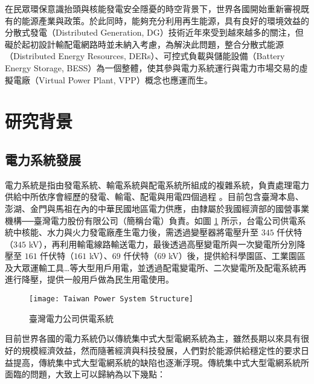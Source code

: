 在民眾環保意識抬頭與核能發電安全隱憂的時空背景下，世界各國開始重新審視既有的能源產業與政策。於此同時，能夠充分利用再生能源，具有良好的環境效益的分散式發電（Distributed Generation, DG）技術近年來受到越來越多的關注，但礙於起初設計輸配電網路時並未納入考慮，為解決此問題，整合分散式能源（Distributed Energy Resources, DERs）、可控式負載與儲能設備（Battery Energy Storage, BESS）為一個整體，使其參與電力系統運行與電力市場交易的虛擬電廠（Virtual Power Plant, VPP）概念也應運而生。

\section{研究背景}

\subsection{電力系統發展}

電力系統是指由發電系統、輸電系統與配電系統所組成的複雜系統，負責處理電力供給中所依序會經歷的發電、輸電、配電與用電四個過程 \cite{vignolo2001transmission}。目前包含臺灣本島、澎湖、金門與馬祖在內的中華民國地區電力供應，由隸屬於我國經濟部的國營事業機構──臺灣電力股份有限公司（簡稱台電）負責。如圖 \ref{figure: Taiwan Power System Structure} 所示，台電公司供電系統中核能、水力與火力發電廠產生電力後，需透過變壓器將電壓升至 $345$ 仟伏特（$345$ \si{\kV}），再利用輸電線路輸送電力，最後透過高壓變電所與一次變電所分別降壓至 $161$ 仟伏特（$161$ \si{\kV}）、$69$ 仟伏特（$69$ \si{\kV}）後，提供給科學園區、工業園區及大眾運輸工具…等大型用戶用電，並透過配電變電所、二次變電所及配電系統再進行降壓，提供一般用戶做為民生用電使用。\cite{taipower-sps}

\begin{figure}[htbp]
  \centering
  \texttt{[image: Taiwan Power System Structure]}
  \caption{臺灣電力公司供電系統}
  \label{figure: Taiwan Power System Structure}
\end{figure}

目前世界各國的電力系統仍以傳統集中式大型電網系統為主，雖然長期以來具有很好的規模經濟效益，然而隨著經濟與科技發展，人們對於能源供給穩定性的要求日益提高，傳統集中式大型電網系統的缺陷也逐漸浮現。傳統集中式大型電網系統所面臨的問題，大致上可以歸納為以下幾點：

